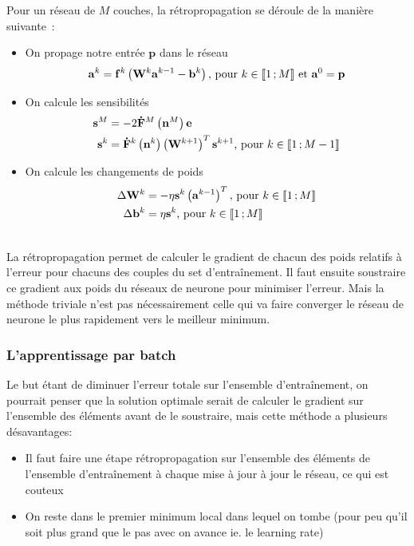 Pour un réseau de $M$ couches, la rétropropagation se déroule de la manière suivante~:
\begin{itemize}
 \item On propage notre entrée $\mathbf{p}$ dans le réseau
 \begin{equation}
   \mathbf{a}^k = \mathbf{f}^k\left(\mathbf{W}^k\mathbf{a}^{k-1} - \mathbf{b}^k\right) \text{, pour $k \in \mathopen{\llbracket}1\,;M\mathclose{\rrbracket}$ et $\mathbf{a}^0 = \mathbf{p}$}
 \end{equation}
 
 \item On calcule les sensibilités 
 \begin{align}
  \mathbf{s}^M &= -2\mathbf{\dot F}^M\left(\mathbf{n}^M\right)\mathbf{e} \\
  \mathbf{s}^k &= \mathbf{\dot F}^k\left(\mathbf{n}^k\right)\left(\mathbf{W}^{k+1}\right)^T \mathbf{s}^{k+1} \text{, pour $k \in \mathopen{\llbracket}1\,;M-1\mathclose{\rrbracket}$}
 \end{align}
 
 \item On calcule les changements de poids
 \begin{align}
  \Delta \mathbf{W}^k &= - \eta \mathbf{s}^k\left(\mathbf{a}^{k-1}\right)^T \text{, pour $k \in \mathopen{\llbracket}1\,;M\mathclose{\rrbracket}$} \\
  \Delta \mathbf{b}^k &= \eta \mathbf{s}^k \text{, pour $k \in \mathopen{\llbracket}1\,;M\mathclose{\rrbracket}$}
 \end{align}

\end{itemize}

\\
La rétropropagation permet de calculer le gradient de chacun des poids relatifs à l'erreur pour chacuns des couples du set d'entraînement. Il faut ensuite soustraire ce gradient
aux poids du réseaux de neurone pour minimiser l'erreur. Mais la méthode triviale n'est pas nécessairement celle qui va faire converger le réseau de neurone le plus rapidement vers le meilleur minimum.

\subsubsection{L'apprentissage par batch}

Le but étant de diminuer l'erreur totale sur l'ensemble d'entraînement, on pourrait penser que la solution optimale serait de calculer le gradient sur l'ensemble des éléments avant de le soustraire,
mais cette méthode a plusieurs désavantages:
\begin{itemize}
 \item Il faut faire une étape rétropropagation sur l'ensemble des éléments de l'ensemble d'entraînement à chaque mise à jour à jour le réseau, ce qui est couteux
 \item On reste dans le premier minimum local dans lequel on tombe (pour peu qu'il soit plus grand que le pas avec on avance ie. le learning rate)
\end{itemize}

